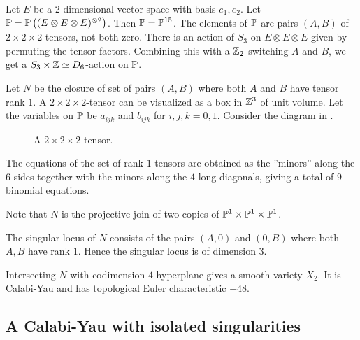 \documentclass[11pt, english]{article}
\begin{document}
Let $E$ be a $2$-dimensional vector space with basis ${e_1,e_2}$. Let $\mathbb{P}=\mathbb{P}\left((E \otimes E \otimes E)^{\otimes 2}\right)$. Then $\mathbb{P}=\mathbb{P}^{15}$. The elements of $\mathbb{P}$ are pairs $(A,B)$ of $2 \times 2 \times 2$-tensors, not both zero. There is an action of $S_3$ on $E \otimes E \otimes E$ given by permuting the tensor factors. Combining this with a $\mathbb{Z}_2$ switching $A$ and $B$, we get a $S_3 \times \mathbb{Z} \simeq D_6$-action on $\mathbb{P}$. 

Let $N$ be the closure of set of pairs $(A,B)$ where both $A$ and $B$ have tensor rank $1$. A $2 \times 2 \times 2$-tensor can be visualized as a box in $\mathbb{Z}^3$ of unit volume. Let the variables on $\mathbb{P}$ be $a_{ijk}$ and $b_{ijk}$ for $i,j,k=0,1$. Consider the diagram in .

\begin{figure}
\centering
{}
\caption{A $2 \times 2 \times 2$-tensor.}
\label{fig:222tensor}
\end{figure}

The equations of the set of rank $1$ tensors are obtained as the ''minors'' along the $6$ sides together with the minors along the $4$ long diagonals, giving a total of $9$ binomial equations. 

Note that $N$ is the projective join of two copies of $\mathbb{P}^1 \times \mathbb{P}^1 \times \mathbb{P}^1$.

The singular locus of $N$ consists of the pairs $(A,0)$ and $(0,B)$ where both $A,B$ have rank $1$. Hence the singular locus is of dimension $3$.

Intersecting $N$ with codimension $4$-hyperplane gives a smooth variety $X_2$. It is Calabi-Yau and has topological Euler characteristic $-48$.

\subsection{A Calabi-Yau with isolated singularities}
\end{document}
